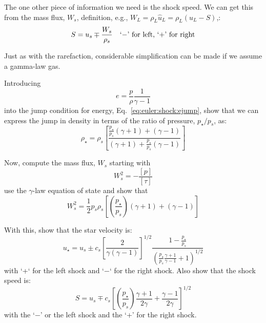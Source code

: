 The one other piece of information we need is the shock speed.  We can
get this from the mass flux, $W_s$, definition, e.g., $W_L = \rho_L
\hat{u}_L = \rho_L (u_L - S)$,:
\begin{equation}
\label{eq:euler-theory:shockgeneral}
S = u_s \mp \frac{W_s}{\rho_s} \quad\mbox{`$-$' for left, `+' for right}\\
\end{equation}

Just as with the rarefaction, considerable simplification can be made if 
we assume a gamma-law gas.

\begin{exercise}
{
Introducing 
\begin{equation}
e = \frac{p}{\rho} \frac{1}{\gamma -1}
\end{equation}
into the jump condition for energy, Eq.~\ref{eq:euler:shock:ejump},
show that we can express the jump in density in terms of the
ratio of pressure, $p_\star/p_s$, as:
\begin{equation}
\label{eq:euler:shockrhojump}
\rho_\star = \rho_s \left [ \frac{ \frac{p_\star}{p_s} (\gamma + 1) + (\gamma - 1)}
   {(\gamma + 1) + \frac{p_\star}{p_s} (\gamma -1)} \right ]
\end{equation}
}

Now, compute the mass flux, $W_s$ starting with
\begin{equation}
W_s^2 = -\frac{[p]}{[\tau]}
\end{equation}
use the $\gamma$-law equation of state and show that
\begin{equation}
W_s^2 = \frac{1}{2} p_s \rho_s \left [ \left(\frac{p_\star}{p_s}\right) (\gamma + 1) + (\gamma -1) \right ]
\end{equation}

With this, show that the star velocity is:
\begin{equation}
\label{eq:euler:shockujump}
u_\star = u_s \pm c_s \left [\frac{2}{\gamma(\gamma - 1)}\right]^{1/2} \frac{1 - \frac{p_\star}{p_s}}{\left ( \frac{p_\star}{p_s} \frac{\gamma + 1}{\gamma - 1} + 1\right)^{1/2}}
\end{equation}
with `+` for the left shock and `$-$` for the right shock.
Also show that the shock speed is:
\begin{equation}
\label{eq:euler:shockspeedjump}
S = u_s \mp c_s \left [ \left ( \frac{p_\star}{p_s} \right ) \frac{\gamma+1}{2\gamma} + \frac{\gamma-1}{2\gamma} \right ]^{1/2}
\end{equation}
with the `$-$' or the left shock and the `+' for the right shock.
\end{exercise}
  
